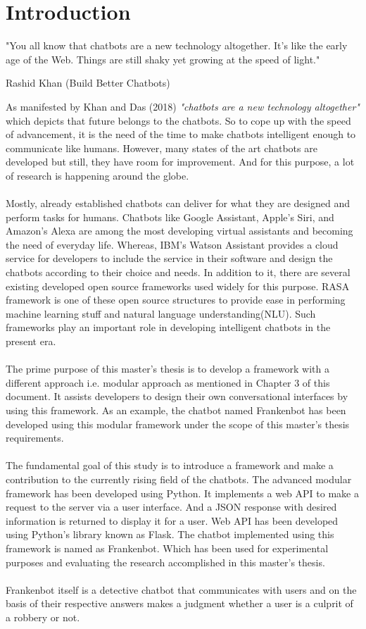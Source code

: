 \chapter{Introduction\label{cha:chapter1}}
\epigraph{"You all know that chatbots are a new technology altogether. It’s like the early age of the Web. Things are still shaky yet growing at the speed of light."}{Rashid Khan (Build Better Chatbots)}
\noindent
As manifested by Khan and Das (2018) {\textit{"chatbots are a new technology altogether"} \cite{buildBetterChatbots}} which depicts that future belongs to the chatbots. So to cope up with the speed of advancement, it is the need of the time to make chatbots intelligent enough to communicate like humans. However, many states of the art chatbots are developed but still, they have room for improvement. And for this purpose, a lot of research is happening around the globe.
\\~\\
Mostly, already established chatbots can deliver for what they are designed and perform tasks for humans. Chatbots like Google Assistant, Apple's Siri, and Amazon's Alexa are among the most developing virtual assistants and becoming the need of everyday life. Whereas, IBM's Watson Assistant provides a cloud service for developers to include the service in their software and design the chatbots according to their choice and needs. In addition to it, there are several existing developed open source frameworks used widely for this purpose. RASA framework is one of these open source structures to provide ease in performing machine learning stuff and natural language understanding(NLU). Such frameworks play an important role in developing intelligent chatbots in the present era. 
\\~\\
The prime purpose of this master's thesis is to develop a framework with a different approach i.e. modular approach as mentioned in Chapter 3 of this document. It assists developers to design their own conversational interfaces by using this framework. As an example, the chatbot named Frankenbot has been developed using this modular framework under the scope of this master's thesis requirements.
\\~\\
The fundamental goal of this study is to introduce a framework and make a contribution to the currently rising field of the chatbots. The advanced modular framework has been developed using Python. It implements a web API to make a request to the server via a user interface. And a JSON response with desired information is returned to display it for a user. Web API has been developed using Python's library known as Flask. The chatbot implemented using this framework is named as Frankenbot. Which has been used for experimental purposes and evaluating the research accomplished in this master's thesis. 
\\~\\
Frankenbot itself is a detective chatbot that communicates with users and on the basis of their respective answers makes a judgment whether a user is a culprit of a robbery or not.

